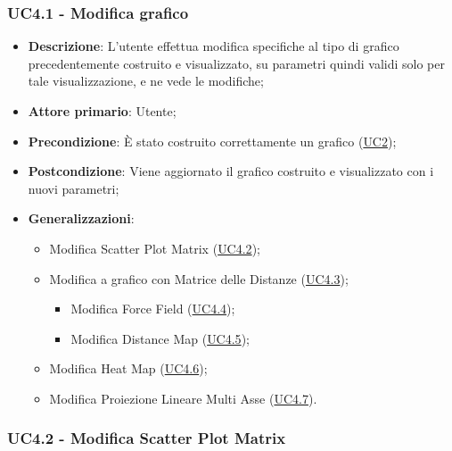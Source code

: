 \newpage
\subsubsection{UC4.1 - Modifica grafico}
\label{ssub:uc4.1}

\begin{itemize}
    \item \textbf{Descrizione}: L’utente effettua modifica specifiche al tipo di grafico precedentemente costruito e visualizzato,
                                su parametri quindi validi solo per tale visualizzazione, e ne vede le modifiche;

    \item \textbf{Attore primario}: Utente;

    \item \textbf{Precondizione}:   È stato costruito correttamente un grafico (\hyperref[sub:uc2]{UC2});

    \item \textbf{Postcondizione}:  Viene aggiornato il grafico costruito e visualizzato con i nuovi parametri;

    \item \textbf{Generalizzazioni}:
        \begin{itemize}
            \item Modifica Scatter Plot Matrix (\hyperref[ssub:uc4.2]{UC4.2});
            \item Modifica a grafico con Matrice delle Distanze (\hyperref[ssub:uc4.3]{UC4.3});
            \begin{itemize}
                \item Modifica Force Field (\hyperref[ssub:uc4.4]{UC4.4});
                \item Modifica Distance Map (\hyperref[ssub:uc4.5]{UC4.5});
             \end{itemize}
            \item Modifica Heat Map (\hyperref[ssub:uc4.6]{UC4.6});
            \item Modifica Proiezione Lineare Multi Asse (\hyperref[ssub:uc4.7]{UC4.7}).
        \end{itemize}
\end{itemize}

\subsubsection{UC4.2 - Modifica Scatter Plot Matrix}
\label{ssub:uc4.2}

